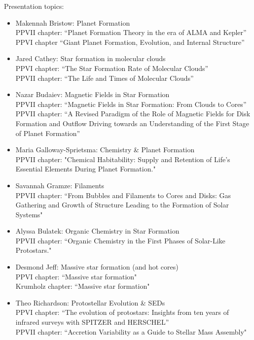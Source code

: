 \documentclass[11pt]{article}
\begin{document}
Presentation topics:

\begin{itemize}
    \item Makennah Bristow: Planet Formation \\
        PPVII chapter: ``Planet Formation Theory in the era of ALMA and Kepler'' \\
        PPVI chapter ``Giant Planet Formation, Evolution, and Internal Structure''
    \item Jared Cathey: Star formation in molecular clouds \\
        PPVI chapter: ``The Star Formation Rate of Molecular Clouds'' \\
        PPVII chapter: ``The Life and Times of Molecular Clouds''
    \item Nazar Budaiev: Magnetic Fields in Star Formation \\
        PPVII chapter: ``Magnetic Fields in Star Formation: From Clouds to Cores''\\
        PPVII chapter: ``A Revised Paradigm of the Role of Magnetic Fields for Disk Formation and Outflow Driving towards an Understanding of the First Stage of Planet Formation''
    \item Maria Galloway-Sprietsma: Chemistry \& Planet Formation \\
        PPVII chapter: "Chemical Habitability: Supply and Retention of Life’s Essential Elements During Planet Formation."
    \item Savannah Gramze: Filaments \\
        PPVII chapter: ``From Bubbles and Filaments to Cores and Disks: Gas Gathering and Growth of Structure Leading to the Formation of Solar Systems"
    \item Alyssa Bulatek: Organic Chemistry in Star Formation \\
        PPVII chapter: ``Organic Chemistry in the First Phases of Solar-Like Protostars."
    \item Desmond Jeff: Massive star formation (and hot cores) \\
        PPVI chapter: ``Massive star formation" \\
        Krumholz chapter: ``Massive star formation"
    \item Theo Richardson: Protostellar Evolution \& SEDs \\
        PPVI chapter: ``The evolution of protostars: Insights from ten years of infrared surveys with SPITZER and HERSCHEL'' \\
        PPVII chapter: ``Accretion Variability as a Guide to Stellar Mass Assembly"
\end{itemize}
\end{document}

